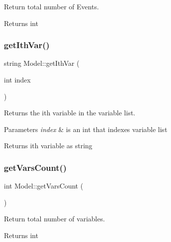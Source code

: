 Return total number of Events. 

\begin{DoxyReturn}{Returns}
int 
\end{DoxyReturn}
\mbox{\label{class_model_adcb9dcc2d1d58f18d595f1476fc77b3b}} 
\subsubsection{\texorpdfstring{get\+Ith\+Var()}{getIthVar()}}
{\footnotesize\ttfamily string Model\+::get\+Ith\+Var (\begin{DoxyParamCaption}\item[{int}]{index }\end{DoxyParamCaption})}



Returns the ith variable in the variable list. 


\begin{DoxyParams}{Parameters}
{\em index} & is an int that indexes variable list \\
\hline
\end{DoxyParams}
\begin{DoxyReturn}{Returns}
ith variable as string 
\end{DoxyReturn}
\mbox{\label{class_model_ae8b56a284c355ff18421174d078dc870}} 
\subsubsection{\texorpdfstring{get\+Vars\+Count()}{getVarsCount()}}
{\footnotesize\ttfamily int Model\+::get\+Vars\+Count (\begin{DoxyParamCaption}{ }\end{DoxyParamCaption})}



Return total number of variables. 

\begin{DoxyReturn}{Returns}
int 
\end{DoxyReturn}
\mbox{\label{class_model_a9ee802e2090b51ae403d39f6ec0138d8}} 
